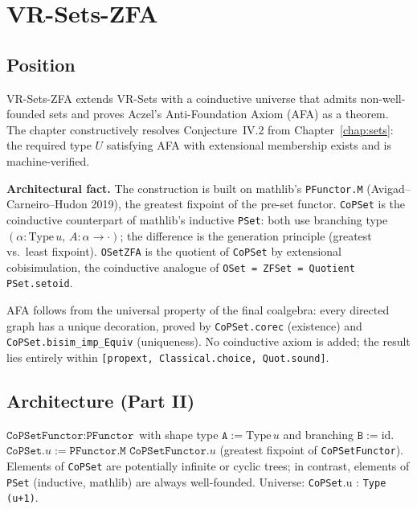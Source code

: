 \chapter{VR-Sets-ZFA}
\label{chap:setszfa}

\section{Position}
\label{sec:setszfa_position}

VR-Sets-ZFA extends VR-Sets with a coinductive universe that admits
non-well-founded sets and proves Aczel's Anti-Foundation Axiom (AFA) as a
theorem.  The chapter constructively resolves Conjecture~IV.2 from
Chapter~\ref{chap:sets}: the required type $U$ satisfying AFA with
extensional membership exists and is machine-verified.

\textbf{Architectural fact.} The construction is built on mathlib's
\texttt{PFunctor.M} (Avigad--Carneiro--Hudon 2019), the greatest fixpoint of
the pre-set functor.  \texttt{CoPSet} is the coinductive counterpart of
mathlib's inductive \texttt{PSet}: both use branching type $(\alpha :
\mathrm{Type}\,u,\, A : \alpha \to \cdot)$; the difference is the
generation principle (greatest vs.\ least fixpoint).  \texttt{OSetZFA} is
the quotient of \texttt{CoPSet} by extensional cobisimulation, the
coinductive analogue of \texttt{OSet = ZFSet = Quotient PSet.setoid}.

AFA follows from the universal property of the final coalgebra: every
directed graph has a unique decoration, proved by \texttt{CoPSet.corec}
(existence) and \texttt{CoPSet.bisim\_imp\_Equiv} (uniqueness).  No
coinductive axiom is added; the result lies entirely within
\texttt{[propext, Classical.choice, Quot.sound]}.

\section{Architecture (Part II)}
\label{sec:setszfa_arch}

\begin{definition}
\label{def:CoPSetFunctor}
\leanok
$\texttt{CoPSetFunctor} : \texttt{PFunctor}$ with shape type
$\texttt{A} := \mathrm{Type}\,u$ and branching $\texttt{B} := \mathrm{id}$.
$\texttt{CoPSet}.{u} := \texttt{PFunctor.M CoPSetFunctor}.{u}$
(greatest fixpoint of \texttt{CoPSetFunctor}).
Elements of \texttt{CoPSet} are potentially infinite or cyclic trees;
in contrast, elements of \texttt{PSet} (inductive, mathlib) are
always well-founded.  Universe: \texttt{CoPSet}.{u} : \texttt{Type
(u+1)}.
\end{definition}

